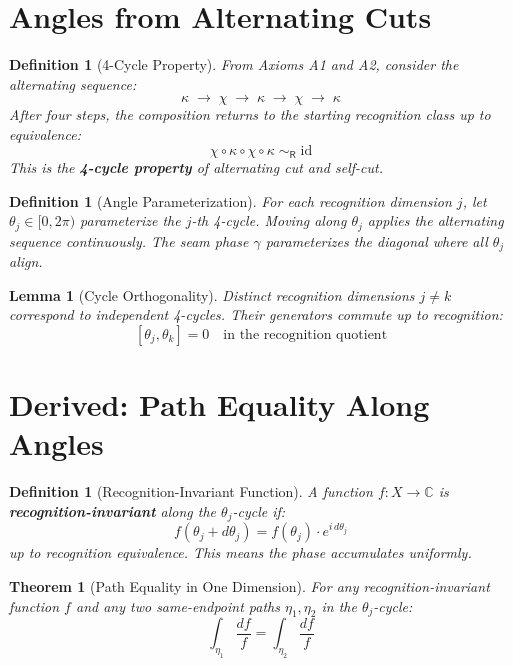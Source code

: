 \documentclass[12pt]{article}
\newtheorem{definition}[axiom]{Definition}
\newtheorem{theorem}[axiom]{Theorem}
\newtheorem{lemma}[axiom]{Lemma}
\newcommand{\rec}{\mathsf{R}}
\begin{document}
\section{Angles from Alternating Cuts}

\begin{definition}[4-Cycle Property]
From Axioms A1 and A2, consider the alternating sequence:
\[
\kappa \;\longrightarrow\; \chi \;\longrightarrow\; \kappa \;\longrightarrow\; \chi \;\longrightarrow\; \kappa
\]
After four steps, the composition returns to the starting recognition class up to equivalence:
\[
\chi \circ \kappa \circ \chi \circ \kappa \;\sim_{\rec}\; \text{id}
\]
This is the \textbf{4-cycle property} of alternating cut and self-cut.
\end{definition}

\begin{definition}[Angle Parameterization]
For each recognition dimension \(j\), let \(\theta_j \in [0, 2\pi)\) parameterize the \(j\)-th 4-cycle.
Moving along \(\theta_j\) applies the alternating sequence continuously.
The seam phase \(\gamma\) parameterizes the diagonal where all \(\theta_j\) align.
\end{definition}

\begin{lemma}[Cycle Orthogonality]
Distinct recognition dimensions \(j \neq k\) correspond to independent 4-cycles.
Their generators commute up to recognition:
\[
[\theta_j, \theta_k] = 0 \quad \text{in the recognition quotient}
\]
\end{lemma}

\section{Derived: Path Equality Along Angles}

\begin{definition}[Recognition-Invariant Function]
A function \(f: X \to \mathbb{C}\) is \textbf{recognition-invariant} along the \(\theta_j\)-cycle if:
\[
f(\theta_j + d\theta_j) = f(\theta_j) \cdot e^{i\,d\theta_j}
\]
up to recognition equivalence. This means the phase accumulates uniformly.
\end{definition}

\begin{theorem}[Path Equality in One Dimension]
For any recognition-invariant function \(f\) and any two same-endpoint paths \(\eta_1, \eta_2\) in the \(\theta_j\)-cycle:
\[
\int_{\eta_1} \frac{df}{f} = \int_{\eta_2} \frac{df}{f}
\]
\end{theorem}
\end{document}
